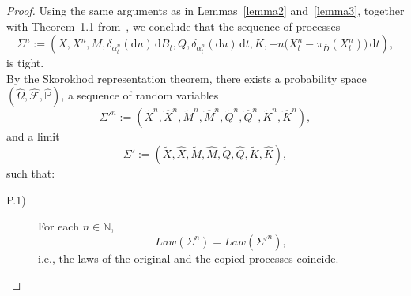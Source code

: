 \documentclass[11pt,amsfonts]{article}
\theoremstyle{plain}
\theoremstyle{assumpstyle}
\numberwithin{equation}{section}
\numberwithin{theorem}{section}
\numberwithin{proposition}{section}
\numberwithin{definition}{section}
\numberwithin{remark}{section}
\numberwithin{corollary}{section}
\numberwithin{lemma}{section}
\begin{document}
\begin{proof}
Using the same arguments as in Lemmas~\ref{lemma2} and~\ref{lemma3}, together with Theorem~1.1 from~\cite[p.~354]{kushnerbook}, we conclude that the sequence of processes
$$
\Sigma^n := (X, X^n, M, \delta_{\alpha^n_t}(\mathrm{d}u)\, \mathrm{d}B_t, Q, \delta_{\alpha^n_t}(\mathrm{d}u)\, \mathrm{d}t,  K, -n\big(X^n_t - \pi_{\bar{D}}(X^n_t)\big)\, \mathrm{d}t),
$$
is tight.\\
By the Skorokhod representation theorem, there exists a probability space $(\hat{\Omega}, \hat{\mathcal{F}}, \hat{\mathbb{P}}) $, a sequence of random variables
$$
\Sigma'^n := (\tilde{X}^n, \hat{X}^n, \tilde{M}^n, \hat{M}^n, \tilde{Q}^n, \hat{Q}^n, \tilde{K}^n, \hat{K}^n),
$$
and a limit
$$
\Sigma' := (\tilde{X}, \hat{X}, \tilde{M}, \hat{M}, \tilde{Q}, \hat{Q}, \tilde{K}, \hat{K}),
$$
such that:
\begin{description}
    \item[P.1)] For each $ n \in \mathbb{N} $,
    $$
    Law(\Sigma^n) = Law(\Sigma'^n),
    $$
    i.e., the laws of the original and the copied processes coincide.
    

\end{description}
\end{proof}
\end{document}
